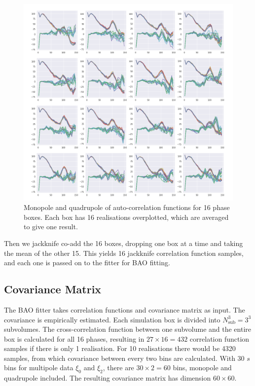 \documentclass[fleqn,usenatbib]{mnras}
\begin{document}
		\begin{figure}
			\includegraphics[width=\linewidth]{xi_r10_phases_tinker13.png}
		    \caption{Monopole and quadrupole of auto-correlation functions for 16 phase boxes. Each box has 16 realisations overplotted, which are averaged to give one result.}
		    \label{fig:xi_r10_phases}
		\end{figure}
		
		Then we jackknife co-add the 16 boxes, dropping one box at a time and taking the mean of the other 15. This yields 16 jackknife correlation function samples, and each one is passed on to the fitter for BAO fitting.

	\subsection{Covariance Matrix}
		
		The BAO fitter takes correlation functions and covariance matrix as input. The covariance is empirically estimated. Each simulation box is divided into $N_\text{sub}^3=3^3$ subvolumes. The cross-correlation function between one subvolume and the entire box is calculated for all 16 phases, resulting in $27 \times 16 = 432$ correlation function samples if there is only 1 realisation. For 10 realisations there would be 4320 samples, from which covariance between every two bins are calculated. With 30 $s$ bins for multipole data $\xi_0$ and $\xi_2$, there are $30\times 2 = 60$ bins, monopole and quadrupole included. The resulting covariance matrix has dimension $60\times 60$.
		
\end{document}
